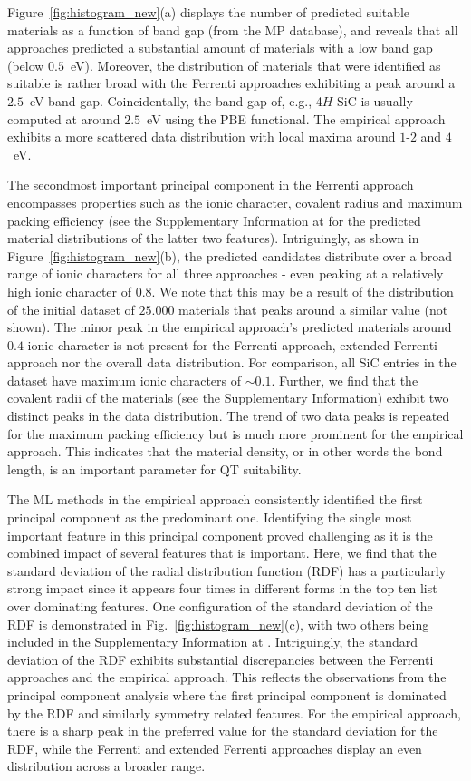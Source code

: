 \documentclass[superscriptaddress,unsortedaddress,
 amsmath,amssymb,
 aps,
]{revtex4-2}
\begin{document}
Figure~\ref{fig:histogram_new}(a) displays the number of predicted suitable materials as a function of band gap (from the MP database), and reveals that all approaches predicted a substantial amount of materials with a low band gap (below $0.5$~eV). Moreover, the distribution of materials that were identified as suitable is rather broad with the Ferrenti approaches exhibiting a peak around a $2.5$~eV band gap. 
Coincidentally, the band gap of, e.g., 4$H$-SiC is usually computed at around $2.5$~eV using the PBE functional. 
The empirical approach exhibits a more scattered data distribution with local maxima around $1$-$2$ and $4$~eV. 

The secondmost important principal component in the Ferrenti approach encompasses properties such as the ionic character, covalent radius and maximum packing efficiency (see the Supplementary Information at \cite{supplementary} for the predicted material distributions of the latter two features).  
Intriguingly, as shown in Figure~\ref{fig:histogram_new}(b), the predicted candidates distribute over a broad range of ionic characters for all three approaches - even peaking at a relatively high ionic character of $0.8$. 
We note that this may be a result of the distribution of the initial dataset of $25.000$ materials that peaks around a similar value (not shown). The minor peak in the empirical approach's predicted materials around $0.4$ ionic character is not present for the Ferrenti approach, extended Ferrenti approach nor the overall data distribution. For comparison, all SiC entries in the dataset have maximum ionic characters of $\sim 0.1$. 
Further, we find that the covalent radii of the materials (see the Supplementary Information) exhibit two distinct peaks in the data distribution. 
The trend of two data peaks is repeated for the maximum packing efficiency but is much more prominent for the empirical approach. This indicates that the material density, or in other words the bond length, is an important parameter for QT suitability.  

The ML methods in the empirical approach consistently identified the first principal component as the predominant one. Identifying the single most important feature in this principal component proved challenging as it is the combined impact of several features that is important. 
Here, we find that the standard deviation of the radial distribution function (RDF) has a  particularly strong impact since it appears four times in different forms in the top ten list over dominating features. One configuration of the standard deviation of the RDF is demonstrated in Fig.~\ref{fig:histogram_new}(c), with two others being included in the Supplementary Information at \cite{supplementary}. Intriguingly, the standard deviation of the RDF exhibits substantial discrepancies between the Ferrenti approaches and the empirical approach. This reflects the observations from the principal component analysis where the first principal component is dominated by the RDF and similarly symmetry related features. For the empirical approach, there is a sharp peak in the preferred value for the standard deviation for the RDF, while the Ferrenti and extended Ferrenti approaches display an even distribution across a broader range. 
\end{document}
